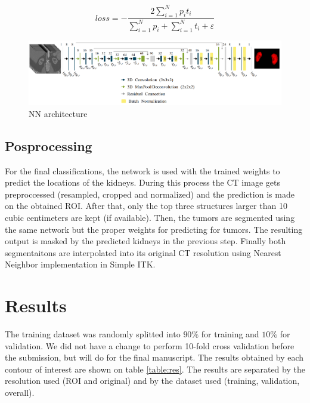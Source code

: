 \documentclass{article}
\begin{document}
\begin{equation}
    loss = - \frac{2 \sum_{i=1}^{N}p_it_i}{\sum_{i=1}^{N}p_i + \sum_{i=1}^{N}t_i + \varepsilon}
    \label{eq:dsc}
\end{equation}

\begin{figure}[h]
    \centering
    \includegraphics[totalheight=.18\textheight]{imgs/nn.png}
    \caption{NN architecture }
    \label{fig:arc}
\end{figure}


\subsection{Posprocessing}
\label{sec:post}
For the final classifications, the network is used with the trained weights to predict the locations of the kidneys. During this process the CT image gets preproccessed (resampled, cropped and normalized) and the prediction is made on the obtained ROI.
After that, only the top three structures  larger than 10 cubic centimeters are kept (if available). Then, the tumors
are segmented using the same network but the proper weights for predicting for tumors. The resulting output is masked
by the predicted kidneys in the previous step. Finally both segmentaitons are interpolated into its original CT resolution using Nearest Neighbor implementation in Simple ITK. 

\section{Results}
\label{sec:results}
The training dataset was randomly splitted into $90\%$ for training and $10\%$ for validation. 
We did not have a change to perform 10-fold cross validation before the submission, but
will do for the final manuscript. The results obtained by each contour of interest are shown on table \ref{table:res}.
The results are separated by the resolution used (ROI and original) and by the dataset used (training, validation, overall). 
\end{document}
